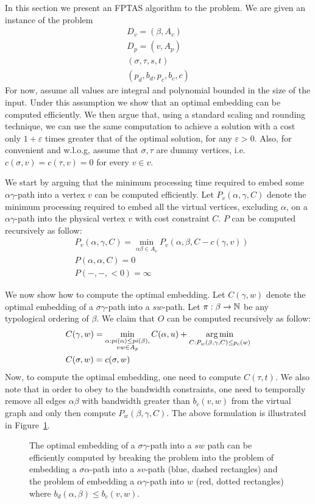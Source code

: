 In this section we present an FPTAS algorithm to the \VPN{} problem.
We are given an instance of the \VPN{} problem 
\begin{align*}
D_v = (\beta , A_v)		\\
D_p = (v, A_p)		\\
(\sigma , \tau , s, t)	\\
(p_d, b_d, p_c, b_c, c)
\end{align*}
For now, assume all values are integral and polynomial bounded in the size of
the input.
Under this assumption we show that an optimal embedding can be computed
efficiently.
We then argue that, using a standard scaling and rounding technique, we can use
the same computation to achieve a solution with a cost only
$1 + \varepsilon$ times greater that of the optimal solution, for any
$\varepsilon > 0$.
Also, for convenient and w.l.o.g, assume that $\sigma , \tau $ are dummy vertices, 
i.e. $c(\sigma , v) = c(\tau , v) = 0$ for every $v \in v$.

We start by arguing that the minimum processing time required to embed some
$\alpha \gamma $-path into a vertex $v$ can be computed efficiently.
Let $P_{v}(\alpha , \gamma , C)$ denote the minimum processing required to embed
all the virtual vertices, excluding $\alpha $, on a $\alpha \gamma $-path into the physical
vertex $v$ with cost constraint $C$.
$P$ can be computed recursively as follow:
\begin{align*}
&P_{v}(\alpha , \gamma , C) = 
\min_{\alpha \beta  \in A_v} P_{v}(\alpha , \beta , C - c(\gamma , v))
\\
&P(\alpha , \alpha , C) = 0
\\
&P(-, -, <0) = \infty
\end{align*}
 
We now show how to compute the optimal embedding.
Let $C(\gamma , w)$ denote the
optimal embedding of a $\sigma \gamma $-path into a $sw$-path.
Let $\pi:\beta  \to \mathbb{N}$ be any typological ordering of $\beta $. 
We claim that $O$ can be computed recursively as follow:
\begin{align*}
&C(\gamma , w) = 
\min_{\substack{
\alpha  : pi(\alpha ) \leq pi(\beta ), 
\\
vw \in A_p
}}
C(\alpha , u)
+
\operatorname*{arg\,min}_{C : P_{w}(\beta , \gamma , C) \leq p_c(w)}
\\
&C(\sigma , w) = c(\sigma , w)
\end{align*}
Now, to compute the optimal embedding, one need to compute $C(\tau , t)$. 
We also note that in order to obey to the bandwidth constraints, 
one need to temporally remove all edges $\alpha \beta $ with bandwidth greater than
$b_c(v, w)$ from the virtual graph and only then compute $P_{w}(\beta , \gamma , C)$.
The above formulation is illustrated in Figure~\ref{fig:dp1}.

\begin{figure}[ht]
\centering

\caption[]{
\label{fig:dp1}
The optimal embedding of a $\sigma \gamma $-path into a $sw$ path can be efficiently 
computed by breaking the problem into the problem of embedding a $\sigma \alpha $-path
into a $sv$-path (blue, dashed rectangles) 
and the problem of embedding a $\alpha \gamma $-path into $w$ (red, dotted
rectangles) where $b_d(\alpha , \beta ) \leq b_c(v, w)$.
}
\end{figure}
